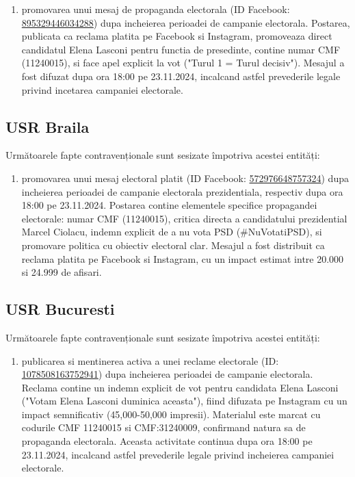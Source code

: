 \documentclass[a4paper,12pt]{article}
\begin{document}
\begin{enumerate}[leftmargin=*, label=\arabic*.)]
    \item promovarea unui mesaj de propaganda electorala (ID Facebook: \href{https://www.facebook.com/ads/library/?id=895329446034288}{895329446034288}) dupa incheierea perioadei de campanie electorala. Postarea, publicata ca reclama platita pe Facebook si Instagram, promoveaza direct candidatul Elena Lasconi pentru functia de presedinte, contine numar CMF (11240015), si face apel explicit la vot ("Turul 1 = Turul decisiv"). Mesajul a fost difuzat dupa ora 18:00 pe 23.11.2024, incalcand astfel prevederile legale privind incetarea campaniei electorale.
\end{enumerate}

\vspace{0.5cm}

\subsection{USR Braila}
Următoarele fapte contravenționale sunt sesizate împotriva acestei entități:

\begin{enumerate}[leftmargin=*, label=\arabic*.)]
    \item promovarea unui mesaj electoral platit (ID Facebook: \href{https://www.facebook.com/ads/library/?id=572976648757324}{572976648757324}) dupa incheierea perioadei de campanie electorala prezidentiala, respectiv dupa ora 18:00 pe 23.11.2024. Postarea contine elementele specifice propagandei electorale: numar CMF (11240015), critica directa a candidatului prezidential Marcel Ciolacu, indemn explicit de a nu vota PSD (\#NuVotatiPSD), si promovare politica cu obiectiv electoral clar. Mesajul a fost distribuit ca reclama platita pe Facebook si Instagram, cu un impact estimat intre 20.000 si 24.999 de afisari.
\end{enumerate}

\vspace{0.5cm}

\subsection{USR Bucuresti}
Următoarele fapte contravenționale sunt sesizate împotriva acestei entități:

\begin{enumerate}[leftmargin=*, label=\arabic*.)]
    \item publicarea si mentinerea activa a unei reclame electorale (ID: \href{https://www.facebook.com/ads/library/?id=1078508163752941}{1078508163752941}) dupa incheierea perioadei de campanie electorala. Reclama contine un indemn explicit de vot pentru candidata Elena Lasconi ("Votam Elena Lasconi duminica aceasta"), fiind difuzata pe Instagram cu un impact semnificativ (45,000-50,000 impresii). Materialul este marcat cu codurile CMF 11240015 si CMF:31240009, confirmand natura sa de propaganda electorala. Aceasta activitate continua dupa ora 18:00 pe 23.11.2024, incalcand astfel prevederile legale privind incheierea campaniei electorale.
\end{enumerate}
\end{document}
